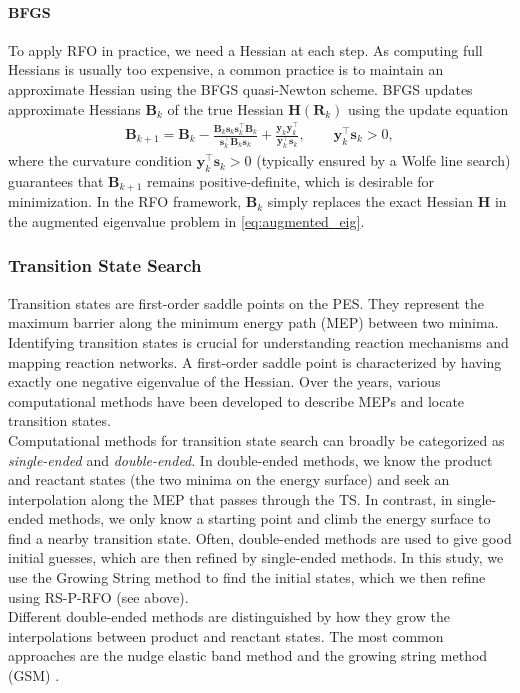 \documentclass[pdflatex,sn-mathphys-num]{sn-jnl}%
\theoremstyle{thmstyleone}%
\theoremstyle{thmstyletwo}%
\theoremstyle{thmstylethree}%
\begin{document}
\begin{appendices}
\paragraph{BFGS}
\label{sec:bfgs}
To apply RFO in practice, we need a Hessian at each step. As computing full Hessians is usually too expensive, a common practice is to maintain an approximate Hessian using the BFGS quasi-Newton scheme. BFGS updates approximate Hessians $\mathbf{B}_k$ of the true Hessian $\mathbf{H}(\mathbf{R}_k)$ using the update equation
\begin{align}
    \mathbf{B}_{k+1} = \mathbf{B}_k 
    - \frac{\mathbf{B}_k \mathbf{s}_k \mathbf{s}_k^\top \mathbf{B}_k}{\mathbf{s}_k^\top \mathbf{B}_k \mathbf{s}_k}
    + \frac{\mathbf{y}_k \mathbf{y}_k^\top}{\mathbf{y}_k^\top \mathbf{s}_k},
    \qquad \mathbf{y}_k^\top \mathbf{s}_k > 0,
\end{align}
where the curvature condition $\mathbf{y}_k^\top \mathbf{s}_k>0$ (typically ensured by a Wolfe line search) guarantees that $\mathbf{B}_{k+1}$ remains positive-definite, which is desirable for minimization. In the RFO framework, $\mathbf{B}_k$ simply replaces the exact Hessian $\mathbf{H}$ in the augmented eigenvalue problem in \eqref{eq:augmented_eig}.

\subsubsection{Transition State Search \label{sec:tssearchliterature}}
Transition states are first-order saddle points on the PES. They represent the maximum barrier along the minimum energy path (MEP) between two minima. Identifying transition states is crucial for understanding reaction mechanisms and mapping reaction networks. A first-order saddle point is characterized by having exactly one negative eigenvalue of the Hessian. Over the years, various computational methods have been developed to describe MEPs and locate transition states. \\
Computational methods for transition state search can broadly be categorized as \textit{single-ended} and \textit{double-ended}. In double-ended methods, we know the product and reactant states (the two minima on the energy surface) and seek an interpolation along the MEP that passes through the TS. In contrast, in single-ended methods, we only know a starting point and climb the energy surface to find a nearby transition state. Often, double-ended methods are used to give good initial guesses, which are then refined by single-ended methods. In this study, we use the Growing String method to find the initial states, which we then refine using RS-P-RFO (see above).\\
Different double-ended methods are distinguished by how they grow the interpolations between product and reactant states. The most common approaches are the nudge elastic band method \citep{henkelman1999, henkelman2000} and the growing string method (GSM) \citep{peters2004,zimmerman2015}. 



\end{appendices}
\end{document}
